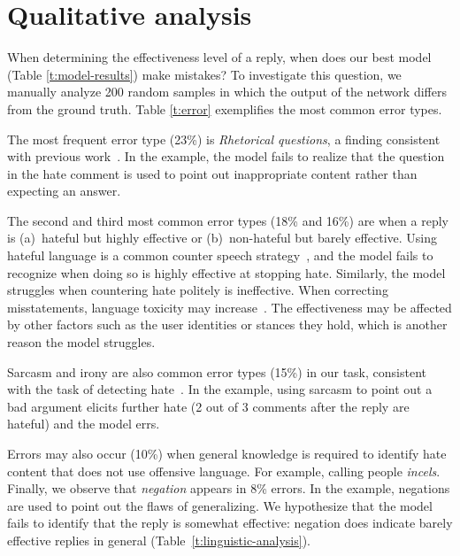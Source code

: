 \documentclass[11pt]{article}
\begin{document}
\section{Qualitative analysis}
\label{s:erroranalysis}

When determining the effectiveness level of a reply,
when does our best model (Table \ref{t:model-results}) make mistakes? 
To investigate this question,
we manually analyze 200 random samples in which the output of the network differs from the ground truth. 
Table \ref{t:error} exemplifies the most common error types.

The most frequent error type (23\%) is \emph{Rhetorical questions},
a finding consistent with previous work~\cite{schmidt-wiegand-2017-survey}. 
In the example,
the model fails to realize that the question in the hate comment is used to point out inappropriate content rather than expecting an answer.

The second and third most common error types (18\% and 16\%)
are when a reply is
(a)~hateful but highly effective
or
(b)~non-hateful but barely effective.
Using hateful language is a common counter speech strategy~\cite{DBLP:conf/icwsm/MathewSTRSMG019},
and the model fails to recognize when doing so is highly effective at stopping hate.
Similarly, the model struggles when countering hate politely is ineffective.
When correcting misstatements, language toxicity may increase~\cite{10.1145/3411764.3445642}.
The effectiveness may be affected by other factors such as the user identities or stances they hold, which is another reason the model struggles.


Sarcasm and irony are also common error types (15\%) in our task,
consistent with the task of detecting hate~\cite{nobata2016abusive,qian-etal-2019-benchmark}.
In the example, using sarcasm to point out a bad argument elicits further hate (2 out of 3 comments after the reply are hateful)
and the model errs.

Errors may also occur (10\%) when general knowledge is required to identify hate content that does not use offensive language.
For example, calling people \emph{incels}.
Finally, we observe that \emph{negation} appears in 8\% errors.
In the example, negations are used to point out the flaws of generalizing.
We hypothesize that the model fails to identify that the reply is somewhat effective: negation does indicate barely effective replies in general (Table~\ref{t:linguistic-analysis}).
\end{document}
